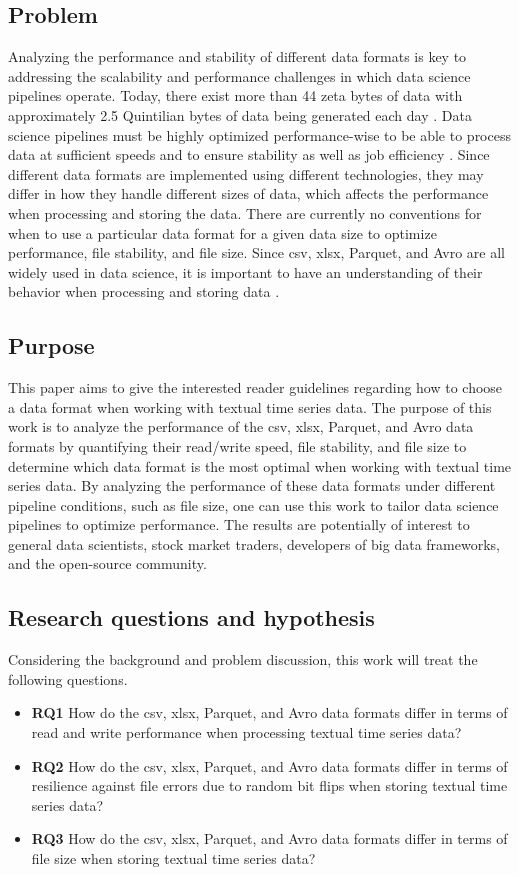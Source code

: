 \subsection{Problem}
\label{sect:problem}
Analyzing the performance and stability of different data formats is key to addressing the scalability and performance challenges in which data science pipelines operate. Today, there exist more than 44 zeta bytes of data with approximately 2.5 Quintilian bytes of data being generated each day \cite{howarth_30_2022}. Data science pipelines must be highly optimized performance-wise to be able to process data at sufficient speeds and to ensure stability as well as job efficiency \cite{cao_data_2017}. Since different data formats are implemented using different technologies, they may differ in how they handle different sizes of data, which affects the performance when processing and storing the data. There are currently no conventions for when to use a particular data format for a given data size to optimize performance, file stability, and file size. Since csv, xlsx, Parquet, and Avro are all widely used in data science, it is important to have an understanding of their behavior when processing and storing data \cite{cao_data_2017}.

\subsection{Purpose}
\label{sec:purpose}
This paper aims to give the interested reader guidelines regarding how to choose a data format when working with textual time series data. The purpose of this work is to analyze the performance of the csv, xlsx, Parquet, and Avro data formats by
quantifying their read/write speed, file stability, and file size to determine which data format is the most optimal when working with textual time series data. By analyzing the performance of these data formats under different pipeline conditions, such as file size, one can use this work to tailor data science pipelines to optimize performance. The results are potentially of interest to general data scientists, stock market traders, developers of big data frameworks, and the open-source community.

\clearpage
\subsection{Research questions and hypothesis}
Considering the background and problem discussion, this work will treat the following questions. 
\label{sect:questions}
\begin{itemize}
    \item \textbf{RQ1} How do the csv, xlsx, Parquet, and Avro data formats differ in terms of read and write performance when processing textual time series data?
    \item \textbf{RQ2} How do the csv, xlsx, Parquet, and Avro data formats differ in terms of resilience against file errors due to random bit flips when storing textual time series data?
    \item \textbf{RQ3} How do the csv, xlsx, Parquet, and Avro data formats differ in terms of file size when storing textual time series data?
\end{itemize}

